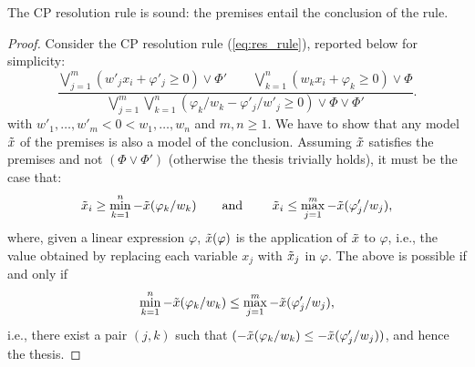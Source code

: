 \begin{lem}%
    The CP resolution rule is sound: the premises entail the conclusion of the rule.
\end{lem}

\begin{proof}
        Consider the CP resolution rule (\ref{eq:res_rule}), reported below for simplicity:
$$
    \frac{\bigvee_{j=1}^m(w'_j x_i + \varphi'_j \ge 0) \vee \Phi' 
    \qquad 
    \bigvee_{k=1}^n(w_k x_i + \varphi_k \ge 0) \vee \Phi}
{\bigvee_{j=1}^m\bigvee_{k=1}^n({\varphi_k}/{w_k} - {\varphi'_j}/{w'_j} \ge 0) \vee \Phi \vee \Phi'}.
$$
with $w'_1,\ldots,w'_m < 0 < w_1,\ldots,w_n$ and $m,n\ge 1$.
We have to show that any model $\tilde{x}$ of the premises is also a model of the conclusion. Assuming $\tilde{x}$ satisfies the premises and not $(\Phi \vee \Phi')$ (otherwise the thesis trivially holds), it must be the case that: 
        $$
        \tilde{x}_i \ge \min_{k=1}^n - \tilde{x}(\varphi_k/w_k) \text{\qquad and \qquad} \tilde{x}_i \le \max_{j=1}^m - \tilde{x}(\varphi'_j/w_j),
        $$
        where, given a linear expression $\varphi$, $\tilde{x}(\varphi)$ is the application of $\tilde{x}$ to $\varphi$, i.e., the value obtained by replacing each variable $x_j$ with $\tilde{x}_j$ in $\varphi$.
        The above is possible if and only if 
        $$
        \min_{k=1}^n - \tilde{x}(\varphi_k/w_k) \le \max_{j=1}^m - \tilde{x}(\varphi'_j/w_j),
        $$ 
        i.e., there exist a pair $(j,k)$ such that $(- \tilde{x}(\varphi_k/w_k) \le - \tilde{x}(\varphi'_j/w_j))$, and hence the thesis.
\end{proof}